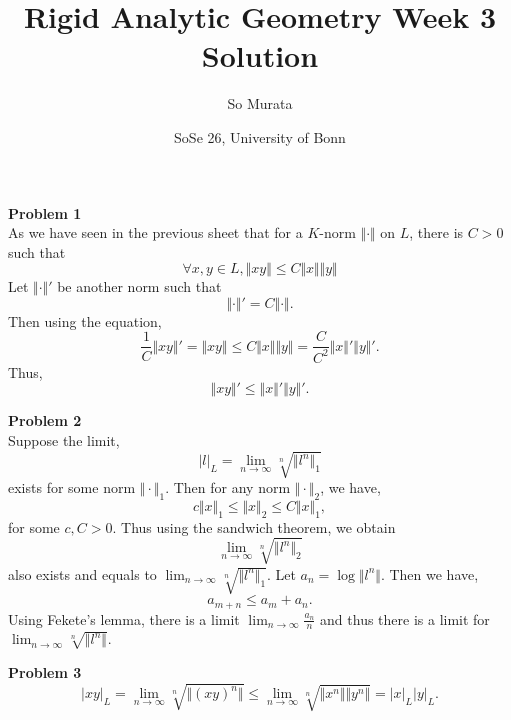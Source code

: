 \documentclass[10pt]{article}
\title{Rigid Analytic Geometry Week 3 Solution}
\author{So Murata}
\date{SoSe 26, University of Bonn}
\newcommand{\norm}[1]{\Vert #1 \Vert}
\newcommand{\ab}[1]{\vert #1 \vert}
\begin{document}
\maketitle

\par\textbf{Problem 1}\\
As we have seen in the previous sheet that for a $K$-norm $\norm{\cdot}$ on $L$, there is $C>0$ such that
\begin{equation*}
    \forall x,y\in L, \norm{xy}\leq C\norm{x}\norm{y}
\end{equation*}
Let $\norm{\cdot}'$ be another norm such that 
\begin{equation*}
    \norm{\cdot}' = C\norm{\cdot}.
\end{equation*}
Then using the equation,
\begin{equation*}
    {\frac 1 C}\norm{xy}'=\norm{xy}\leq C\norm{x}\norm{y} = {\frac C {C^2}}\norm{x}'\norm{y}'.
\end{equation*}
Thus,
\begin{equation*}
    \norm{xy}'\leq \norm{x}'\norm{y}'.
\end{equation*}
\par\textbf{Problem 2}\\
Suppose the limit,
\begin{equation*}
    \ab{l}_L = \lim_{n\to\infty}\sqrt[n]{\norm{l^n}_1}
\end{equation*}
exists for some norm $\norm{\cdot}_1$. Then for any norm $\norm{\cdot}_2$, we have,
\begin{equation*}
    c\norm{x}_1\leq \norm{x}_2\leq C\norm{x}_1,
\end{equation*}
for some $c,C>0$. Thus using the sandwich theorem, we obtain 
\begin{equation*}
    \lim_{n\to\infty}\sqrt[n]{\norm{l^n}_2}
\end{equation*}
also exists and equals to $\lim_{n\to\infty}\sqrt[n]{\norm{l^n}_1}$. 
Let $a_n = \log \norm{l^n}$. Then we have,
\begin{equation*}
    a_{m+n} \leq a_m+a_n.
\end{equation*}
Using Fekete's lemma, there is a limit $\lim_{n\to\infty}{\frac {a_n} n}$ and thus there is a limit for $\lim_{n\to\infty}\sqrt[n]{\norm{l^n}}$.
\par\textbf{Problem 3}
\begin{equation*}
    \ab{xy}_L=\lim_{n\to\infty}\sqrt[n]{\norm{(xy)^n}}\leq \lim_{n\to\infty}\sqrt[n]{\norm{x^n}\norm{y^n}} = \ab{x}_L\ab{y}_L.
\end{equation*}
\end{document}
